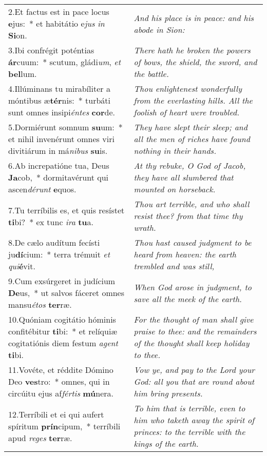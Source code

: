\begin{longtable}{@{\hskip0pt} p{10cm} | p{6cm} @{\hskip0pt}}
2.\enspace Et factus est in pace locus \textbf{e}jus:~* et habitátio e\textit{jus} \textit{in} \textbf{Si}on.
 & \textit{\small And his place is in peace: and his abode in Sion:
}\\
3.\enspace Ibi confrégit poténtias \textbf{ár}cuum:~* scutum, gládi\textit{um}, \textit{et} \textbf{bel}lum.
 & \textit{\small There hath he broken the powers of bows, the shield, the sword, and the battle.
}\\
4.\enspace Illúminans tu mirabíliter a móntibus æ\textbf{tér}nis:~* turbáti sunt omnes insipi\textit{én}\textit{tes} \textbf{cor}de.
 & \textit{\small Thou enlightenest wonderfully from the everlasting hills. All the foolish of heart were troubled.
}\\
5.\enspace Dormiérunt somnum \textbf{su}um:~* et nihil invenérunt omnes viri divitiárum in má\textit{ni}\textit{bus} \textbf{su}is.
 & \textit{\small They have slept their sleep; and all the men of riches have found nothing in their hands.
}\\
6.\enspace Ab increpatióne tua, Deus \textbf{Ja}cob,~* dormitavérunt qui ascen\textit{dé}\textit{runt} \textbf{e}quos.
 & \textit{\small At thy rebuke, O God of Jacob, they have all slumbered that mounted on horseback.
}\\
7.\enspace Tu terríbilis es, et quis resístet \textbf{ti}bi?~* ex tunc \textit{i}\textit{ra} \textbf{tu}a.
 & \textit{\small Thou art terrible, and who shall resist thee? from that time thy wrath.
}\\
8.\enspace De cælo audítum fecísti ju\textbf{dí}cium:~* terra trémuit \textit{et} \textit{qui}\textbf{é}vit.
 & \textit{\small Thou hast caused judgment to be heard from heaven: the earth trembled and was still,
}\\
9.\enspace Cum exsúrgeret in judícium \textbf{De}us,~* ut salvos fáceret omnes mansu\textit{é}\textit{tos} \textbf{ter}ræ.
 & \textit{\small When God arose in judgment, to save all the meek of the earth.
}\\
10.\enspace Quóniam cogitátio hóminis confitébitur \textbf{ti}bi:~* et relíquiæ cogitatiónis diem festum \textit{a}\textit{gent} \textbf{ti}bi.
 & \textit{\small For the thought of man shall give praise to thee: and the remainders of the thought shall keep holiday to thee.
}\\
11.\enspace Vovéte, et réddite Dómino Deo \textbf{ves}tro:~* omnes, qui in circúitu ejus af\textit{fér}\textit{tis} \textbf{mú}nera.
 & \textit{\small Vow ye, and pay to the Lord your God: all you that are round about him bring presents.
}\\
12.\enspace Terríbili et ei qui aufert spíritum \textbf{prín}cipum,~* terríbili apud \textit{re}\textit{ges} \textbf{ter}ræ. & \textit{\small To him that is terrible, even to him who taketh away the spirit of princes: to the terrible with the kings of the earth.}\\
\end{longtable}